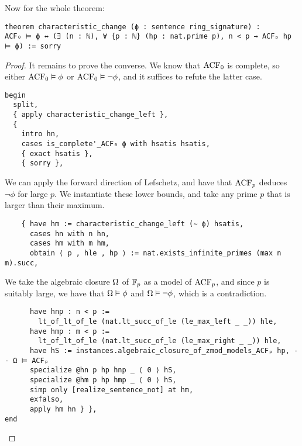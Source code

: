 Now for the whole theorem:

\begin{lstlisting}
theorem characteristic_change (ϕ : sentence ring_signature) :
ACF₀ ⊨ ϕ ↔ (∃ (n : ℕ), ∀ {p : ℕ} (hp : nat.prime p), n < p → ACFₚ hp ⊨ ϕ) := sorry \end{lstlisting}
\begin{proof}
It remains to prove the converse.
We know that $\operatorname{ACF}_{0}$ is complete,
so either $\operatorname{ACF}_{0} \vDash \phi$ or $\operatorname{ACF}_{0} \vDash \neg \phi$,
and it suffices to refute the latter case.

\begin{lstlisting}
begin
  split,
  { apply characteristic_change_left },
  {
    intro hn,
    cases is_complete'_ACF₀ ϕ with hsatis hsatis,
    { exact hsatis },
    { sorry }, \end{lstlisting}

We can apply the forward direction of Lefschetz,
and have that $\operatorname{ACF}_{p}$ deduces $\neg \phi$ for large $p$.
We instantiate these lower bounds, and take any prime $p$ that is larger
than their maximum.

\begin{lstlisting}
    { have hm := characteristic_change_left (∼ ϕ) hsatis,
      cases hn with n hn,
      cases hm with m hm,
      obtain ⟨ p , hle , hp ⟩ := nat.exists_infinite_primes (max n m).succ, \end{lstlisting}

We take the algebraic closure $\Omega$ of $\mathbb{F}_{p}$ as a model of $\operatorname{ACF}_{p}$,
and since $p$ is suitably large, we have that $\Omega \vDash \phi$ and
$\Omega \vDash \neg \phi$, which is a contradiction.

\begin{lstlisting}
      have hnp : n < p :=
        lt_of_lt_of_le (nat.lt_succ_of_le (le_max_left _ _)) hle,
      have hmp : m < p :=
        lt_of_lt_of_le (nat.lt_succ_of_le (le_max_right _ _)) hle,
      have hS := instances.algebraic_closure_of_zmod_models_ACFₚ hp, -- Ω ⊨ ACFₚ
      specialize @hn p hp hnp _ ⟨ 0 ⟩ hS,
      specialize @hm p hp hmp _ ⟨ 0 ⟩ hS,
      simp only [realize_sentence_not] at hm,
      exfalso,
      apply hm hn } },
end \end{lstlisting}

\end{proof}
